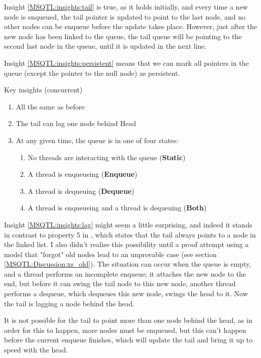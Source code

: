 \documentclass[twoside,11pt,openright]{report}
\begin{document}
Insight \ref{MSQTL:insights:tail} is true, as it holds initially, and every time a new node is enqueued, the tail pointer is updated to point to the last node, and no other nodes can be enqueue before the update takes place. However, just after the new node has been linked to the queue, the tail queue will be pointing to the second last node in the queue, until it is updated in the next line.

Insight \ref{MSQTL:insights:persistent} means that we can mark all pointers in the queue (except the pointer to the null node) as persistent.

Key insights (concurrent)
\begin{enumerate}
  \item All the same as before
  \item\label{MSQTL:insights:lag} The tail can lag one node behind Head
  \item\label{MSQTL:insights:states} At any given time, the queue is in one of four states:
    \begin{enumerate}
      \item\label{MSQTL:insights:state:static} No threads are interacting with the queue (\textbf{Static})
      \item\label{MSQTL:insights:state:enqueue} A thread is enqueueing (\textbf{Enqueue})
      \item\label{MSQTL:insights:state:dequeue} A thread is dequeuing (\textbf{Dequeue})
      \item\label{MSQTL:insights:state:both} A thread is enqueueing and a thread is dequeuing (\textbf{Both})
    \end{enumerate}
\end{enumerate}

Insight \ref{MSQTL:insights:lag} might seem a little surprising, and indeed it stands in contrast to property 5 in \cite{DBLP:conf/podc/MichaelS96}, which states that the tail always points to a node in the linked list. I also didn't realise this possibility until a proof attempt using a model that "forgot" old nodes lead to an unprovable case (see section \ref{MSQTL:Discussion:xs_old}). The situation can occur when the queue is empty, and a thread performs an incomplete enqueue; it attaches the new node to the end, but before it can swing the tail node to this new node, another thread performs a dequeue, which dequeues this new node, swings the head to it. Now the tail is lagging a node behind the head.

It is not possible for the tail to point more than one node behind the head, as in order for this to happen, more nodes must be enqueued, but this can't happen before the current enqueue finishes, which will update the tail and bring it up to speed with the head.
\end{document}
